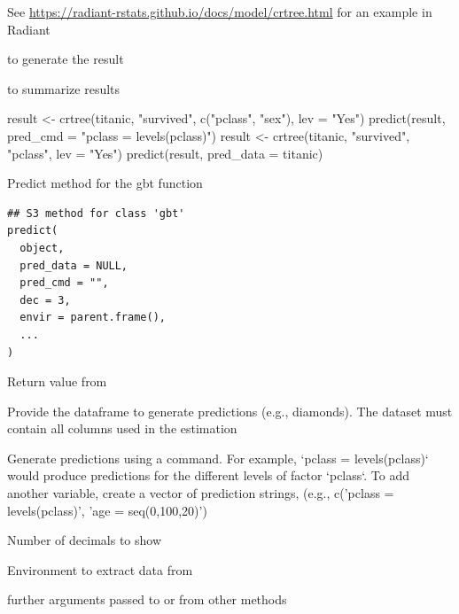 \documentclass[a4paper]{book}
\begin{document}
%
\begin{Details}
See \url{https://radiant-rstats.github.io/docs/model/crtree.html} for an example in Radiant
\end{Details}
%
\begin{SeeAlso}
 to generate the result

 to summarize results
\end{SeeAlso}
%
\begin{Examples}
\begin{ExampleCode}
result <- crtree(titanic, "survived", c("pclass", "sex"), lev = "Yes")
predict(result, pred_cmd = "pclass = levels(pclass)")
result <- crtree(titanic, "survived", "pclass", lev = "Yes")
predict(result, pred_data = titanic) %
\end{ExampleCode}
\end{Examples}
%
\begin{Description}
Predict method for the gbt function
\end{Description}
%
\begin{Usage}
\begin{verbatim}
## S3 method for class 'gbt'
predict(
  object,
  pred_data = NULL,
  pred_cmd = "",
  dec = 3,
  envir = parent.frame(),
  ...
)
\end{verbatim}
\end{Usage}
%
\begin{Arguments}
\begin{ldescription}
\item[\code{object}] Return value from 

\item[\code{pred\_data}] Provide the dataframe to generate predictions (e.g., diamonds). The dataset must contain all columns used in the estimation

\item[\code{pred\_cmd}] Generate predictions using a command. For example, `pclass = levels(pclass)` would produce predictions for the different levels of factor `pclass`. To add another variable, create a vector of prediction strings, (e.g., c('pclass = levels(pclass)', 'age = seq(0,100,20)')

\item[\code{dec}] Number of decimals to show

\item[\code{envir}] Environment to extract data from

\item[\code{...}] further arguments passed to or from other methods
\end{ldescription}
\end{Arguments}
\end{document}
